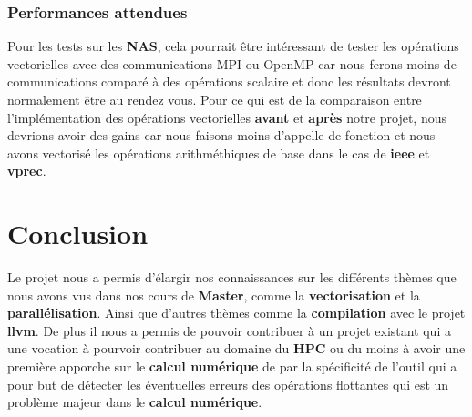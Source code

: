 \documentclass[11pt]{article}
\begin{document}
\subsubsection{Performances attendues}
\label{sec:org90e85d4}

Pour les tests sur les \textbf{NAS}, cela pourrait être intéressant de tester les
opérations vectorielles avec des communications MPI ou OpenMP car nous ferons
moins de communications comparé à des opérations scalaire et donc les
résultats devront normalement être au rendez vous.
\vspace{5mm}
Pour ce qui est de la comparaison entre l'implémentation des opérations
vectorielles \textbf{avant} et \textbf{après} notre projet, nous devrions avoir des gains
car nous faisons moins d'appelle de fonction et nous avons vectorisé les
opérations arithméthiques de base dans le cas de \textbf{ieee} et \textbf{vprec}.

\section{Conclusion}
\label{sec:org9685918}

Le projet nous a permis d'élargir nos connaissances sur les différents thèmes
que nous avons vus dans nos cours de \textbf{Master}, comme la \textbf{vectorisation} et la
\textbf{parallélisation}. Ainsi que d'autres thèmes comme la \textbf{compilation} avec le
projet \textbf{llvm}.
\vspace{5mm}
De plus il nous a permis de pouvoir contribuer à un projet existant qui a une
vocation à pourvoir contribuer au domaine du \textbf{HPC} ou du moins à avoir une
première apporche sur le \textbf{calcul numérique} de par la spécificité de l'outil
qui a pour but de détecter les éventuelles erreurs des opérations flottantes
qui est un problème majeur dans le \textbf{calcul numérique}.
\end{document}

